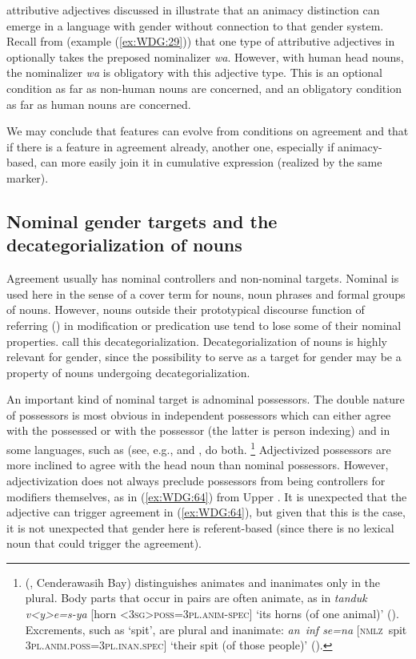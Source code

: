 \documentclass[output=collectionpaper]{langsci/langscibook}
\begin{document}
 attributive adjectives discussed in  illustrate that an animacy distinction can emerge in a language with gender without connection to that gender system. Recall from  (example (\ref{ex:WDG:29})) that one type of attributive adjectives in  optionally takes the preposed nominalizer \textit{wa}. However, with human head nouns, the nominalizer \textit{wa} is obligatory with this adjective type. This is an optional condition as far as non-human nouns are concerned, and an obligatory condition as far as human nouns are concerned.

We may conclude that features can evolve from conditions on agreement and that if there is a feature in agreement already, another one, especially if animacy-based, can more easily join it in cumulative expression (realized by the same marker).

  \subsection{Nominal gender targets and the decategorialization of nouns}
\label{sec:WDG:7.6}

Agreement usually has nominal controllers and non-nominal targets. Nominal is used here in the sense of a cover term for nouns, noun phrases and formal groups of nouns. However, nouns outside their prototypical discourse function of referring (\citealt[87]{Croft2001}) in modification or predication use tend to lose some of their nominal properties. \cite[711]{Hopper1984} call this decategorialization. Decategorialization of nouns is highly relevant for gender, since the possibility to serve as a target for gender may be a property of nouns undergoing decategorialization.

An important kind of nominal target is adnominal possessors. The double nature of possessors is most obvious in independent possessors which can either agree with the possessed or with the possessor (the latter is person indexing) and in some languages, such as  (see, e.g.,  and , do both.%
\footnote{%
 (, Cenderawasih Bay) distinguishes animates and inanimates only in the plural. Body parts that occur in pairs are often animate, as in \textit{tanduk v<y>e=s-ya} [horn \textsc{<3sg>poss=3pl.anim-spec}] `its horns (of one animal)' (\citealt[106]{Heuvel2006}). Excrements, such as `spit', are plural and inanimate: \textit{an~inf se=na} [\textsc{nmlz}~spit \textsc{3pl.anim.poss=3pl.inan.spec}] `their spit (of those people)' (\citealt[273]{Heuvel2006}).
} %
Adjectivized possessors are more inclined to agree with the head noun than nominal possessors. However, adjectivization does not always preclude possessors from being controllers for modifiers themselves, as in (\ref{ex:WDG:64}) from Upper . It is unexpected that the  adjective can trigger agreement in (\ref{ex:WDG:64}), but given that this is the case, it is not unexpected that gender here is referent-based (since there is no lexical noun that could trigger the agreement).
\end{document}
